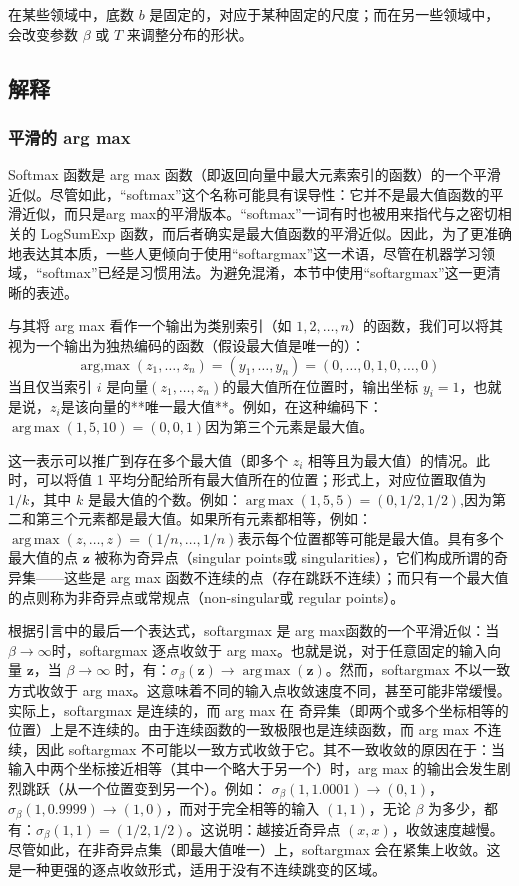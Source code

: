 在某些领域中，底数 $b$ 是固定的，对应于某种固定的尺度；而在另一些领域中，会改变参数 $\beta$ 或 $T$ 来调整分布的形状。
\subsection{解释}
\subsubsection{平滑的 arg max}
Softmax 函数是 arg max 函数（即返回向量中最大元素索引的函数）的一个平滑近似。尽管如此，“softmax”这个名称可能具有误导性：它并不是最大值函数的平滑近似，而只是arg max的平滑版本。“softmax”一词有时也被用来指代与之密切相关的 LogSumExp 函数，而后者确实是最大值函数的平滑近似。因此，为了更准确地表达其本质，一些人更倾向于使用“softargmax”这一术语，尽管在机器学习领域，“softmax”已经是习惯用法。为避免混淆，本节中使用“softargmax”这一更清晰的表述。

与其将 arg max 看作一个输出为类别索引（如 $1, 2, \dots, n$）的函数，我们可以将其视为一个输出为独热编码的函数（假设最大值是唯一的）：
$$
\operatorname{arg,max}(z_1, \dots, z_n) = (y_1, \dots, y_n) = (0, \dots,0,1,0,\dots, 0)~
$$
当且仅当索引 $i$ 是向量$(z_1, \dots, z_n)$的最大值所在位置时，输出坐标 $y_i = 1$，也就是说，$z_i$是该向量的**唯一最大值**。例如，在这种编码下：$\operatorname{arg\,max}(1, 5, 10) = (0, 0, 1)$因为第三个元素是最大值。

这一表示可以推广到存在多个最大值（即多个 $z_i$ 相等且为最大值）的情况。此时，可以将值 1 平均分配给所有最大值所在的位置；形式上，对应位置取值为 $1/k$，其中 $k$ 是最大值的个数。例如：$\operatorname{arg\,max}(1, 5, 5) = (0, 1/2, 1/2)$,因为第二和第三个元素都是最大值。如果所有元素都相等，例如：$\operatorname{arg\,max}(z, \dots, z) = \left( 1/n, \dots, 1/n \right)$表示每个位置都等可能是最大值。具有多个最大值的点 $\mathbf{z}$ 被称为奇异点（singular points或 singularities），它们构成所谓的奇异集——这些是 arg max 函数不连续的点（存在跳跃不连续）；而只有一个最大值的点则称为非奇异点或常规点（non-singular或 regular points）。

根据引言中的最后一个表达式，softargmax 是 arg max函数的一个平滑近似：当$\beta \to \infty$时，softargmax 逐点收敛于 arg max。也就是说，对于任意固定的输入向量 $\mathbf{z}$，当 $\beta \to \infty$ 时，有：$\sigma_{\beta}(\mathbf{z}) \to \operatorname{arg\,max}(\mathbf{z})$。然而，softargmax 不以一致方式收敛于 arg max。这意味着不同的输入点收敛速度不同，甚至可能非常缓慢。实际上，softargmax 是连续的，而 arg max 在 奇异集（即两个或多个坐标相等的位置）上是不连续的。由于连续函数的一致极限也是连续函数，而 arg max 不连续，因此 softargmax 不可能以一致方式收敛于它。其不一致收敛的原因在于：当输入中两个坐标接近相等（其中一个略大于另一个）时，arg max 的输出会发生剧烈跳跃（从一个位置变到另一个）。例如：
$\sigma_\beta(1, 1.0001) \to (0, 1)$，$\sigma_\beta(1, 0.9999) \to (1, 0)$，而对于完全相等的输入 $(1, 1)$，无论 $\beta$ 为多少，都有：$\sigma_\beta(1, 1) = (1/2, 1/2)$。这说明：越接近奇异点 $(x, x)$，收敛速度越慢。尽管如此，在非奇异点集（即最大值唯一）上，softargmax 会在紧集上收敛。这是一种更强的逐点收敛形式，适用于没有不连续跳变的区域。

